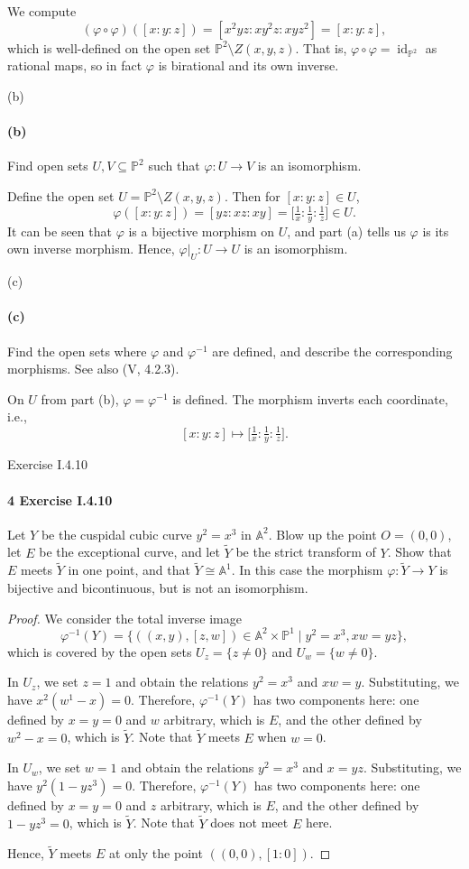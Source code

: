 \documentclass[12pt]{article}
\newlength{\myparskip}
\newenvironment{fullbox}{\begin{lrbox}{\savefullbox}\begin{minipage}{\dimexpr\textwidth-2\fboxsep\relax}\setlength{\parskip}{\myparskip}}{\end{minipage}\end{lrbox}\framebox[\textwidth]{\usebox{\savefullbox}}}
\newenvironment{pbox}[1][]{\begin{fullbox}\ifx#1\empty\else\paragraph{#1}\fi}{\end{fullbox}}
\renewcommand{\phi}{\varphi}
\newcommand{\<}{\langle}
\renewcommand{\>}{\rangle}
\newcommand{\isom}{\cong}
\DeclareMathOperator{\id}{id}
\newcommand{\A}{\mathbb{A}}
\renewcommand{\P}{\mathbb{P}}
\begin{document}
We compute
\[
    (\phi \circ \phi)([x : y : z])
        = [x^2yz : xy^2z : xyz^2]
        = [x : y : z],
\]
which is well-defined on the open set $\P^2 \setminus Z(x, y, z)$. That is, $\phi \circ \phi = \id_{\P^2}$ as rational maps, so in fact $\phi$ is birational and its own inverse.

\begin{pbox}[(b)]
    Find open sets $U, V \subseteq \P^2$ such that $\phi : U \to V$ is an isomorphism.
\end{pbox}

Define the open set $U = \P^2 \setminus Z(x, y, z)$. Then for $[x : y : z] \in U$,
\[
    \phi([x : y : z]) = [yz : xz : xy] = \big[\tfrac{1}{x} : \tfrac{1}{y} : \tfrac{1}{z}\big] \in U.
\]
It can be seen that $\phi$ is a bijective morphism on $U$, and part (a) tells us $\phi$ is its own inverse morphism. Hence, $\phi|_U : U \to U$ is an isomorphism.

\begin{pbox}[(c)]
    Find the open sets where $\phi$ and $\phi^{-1}$ are defined, and describe the corresponding morphisms. See also (V, 4.2.3).
\end{pbox}

On $U$ from part (b), $\phi = \phi^{-1}$ is defined. The morphism inverts each coordinate, i.e.,
\[
    [x : y : z] \longmapsto \big[\tfrac{1}{x} : \tfrac{1}{y} : \tfrac{1}{z}\big].
\]


\newpage
\begin{pbox}[4 Exercise I.4.10]
    Let $Y$ be the cuspidal cubic curve $y^2 = x^3$ in $\A^2$. Blow up the point $O = (0, 0)$, let $E$ be the exceptional curve, and let $\tilde{Y}$ be the strict transform of $Y$. Show that $E$ meets $\tilde{Y}$ in one point, and that $\tilde{Y} \isom \A^1$. In this case the morphism $\phi : \tilde{Y} \to Y$ is bijective and bicontinuous, but is not an isomorphism.
\end{pbox}

\begin{proof}
    We consider the total inverse image
    \[
        \phi^{-1}(Y) = \{((x, y), [z, w]) \in \A^2 \times \P^1 \mid y^2 = x^3,  xw = yz\},
    \]
    which is covered by the open sets $U_z = \{z \ne 0\}$ and $U_w = \{w \ne 0\}$.

    In $U_z$, we set $z = 1$ and obtain the relations $y^2 = x^3$ and $xw = y$. Substituting, we have $x^2(w^1 - x) = 0$. Therefore, $\phi^{-1}(Y)$ has two components here: one defined by $x = y = 0$ and $w$ arbitrary, which is $E$, and the other defined by $w^2 - x = 0$, which is $\tilde{Y}$. Note that $\tilde{Y}$ meets $E$ when $w = 0$.

    In $U_w$, we set $w = 1$ and obtain the relations $y^2 = x^3$ and $x = yz$. Substituting, we have $y^2(1 - yz^3) = 0$. Therefore, $\phi^{-1}(Y)$ has two components here: one defined by $x = y = 0$ and $z$ arbitrary, which is $E$, and the other defined by $1 - yz^3 = 0$, which is $\tilde{Y}$. Note that $\tilde{Y}$ does not meet $E$ here.

    Hence, $\tilde{Y}$ meets $E$ at only the point $((0, 0), [1 : 0])$.

\end{proof}
\end{document}
